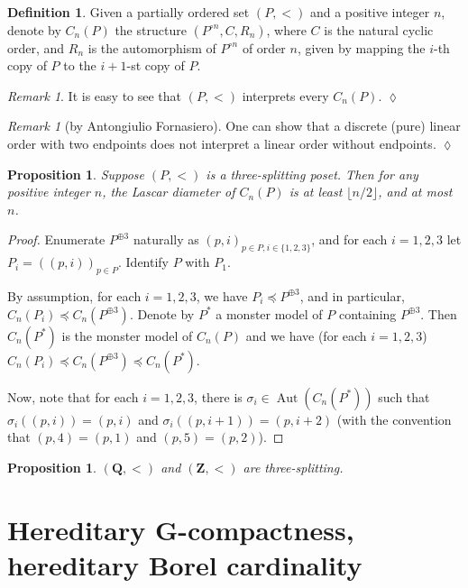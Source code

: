 \documentclass[final,a4paper,12pt]{amsart}
\newcommand{\bZ}{{\mathbf{Z}}}
\newcommand{\bQ}{{\mathbf{Q}}}
\DeclareMathOperator{\Aut}{{Aut}}
\newtheorem{prop}[thm]{Proposition}
\theoremstyle{remark}
\newtheorem{rem}[thm]{Remark}
\theoremstyle{definition}
\newtheorem{dfn}[thm]{Definition}
\newcommand{\xqed}[1]{%
	\leavevmode\unskip\penalty9999 \hbox{}\nobreak\hfill
	\quad\hbox{\ensuremath{#1}}}
\begin{document}
	\begin{dfn}
		Given a partially ordered set $(P,<)$ and a positive integer $n$, denote by $C_n(P)$ the structure $(P^{\circ n},C,R_n)$, where $C$ is the natural cyclic order, and $R_n$ is the automorphism of $P^{\circ n}$ of order $n$, given by mapping the $i$-th copy of $P$ to the $i+1$-st copy of $P$.
	\end{dfn}
	
	\begin{rem}
		It is easy to see that $(P,<)$ interprets every $C_n(P)$.\xqed{\lozenge}
	\end{rem}
	
	\begin{rem}[by Antongiulio Fornasiero]
		One can show that a discrete (pure) linear order with two endpoints does not interpret a linear order without endpoints.\xqed{\lozenge}
	\end{rem}
	
	\begin{prop}
		Suppose $(P,<)$ is a three-splitting poset. Then for any positive integer $n$, the Lascar diameter of $C_n(P)$ is at least $\lfloor n/2\rfloor$, and at most $n$.
	\end{prop}
	\begin{proof}
		Enumerate $P^{\oplus 3}$ naturally as $(p,i)_{p\in P,i\in \{1,2,3\}}$, and for each $i=1,2,3$ let $P_i=((p,i))_{p\in P}$. Identify $P$ with $P_1$.
		
		By assumption, for each $i=1,2,3$, we have $P_i\preceq P^{\oplus 3}$, and in particular, $C_n(P_i)\preceq C_n(P^{\oplus 3})$. Denote by $P^*$ a monster model of $P$ containing $P^{\oplus 3}$. Then $C_n(P^*)$ is the monster model of $C_n(P)$ and we have (for each $i=1,2,3$) $C_n(P_i)\preceq C_n(P^{\oplus 3})\preceq C_n(P^*)$.
		
		Now, note that for each $i=1,2,3$, there is $\sigma_i\in \Aut(C_n(P^*))$ such that $\sigma_i((p,i))=(p,i)$ and $\sigma_i((p,i+1))=(p,i+2)$ (with the convention that $(p,4)=(p,1)$ and $(p,5)=(p,2)$).
	\end{proof}
	
	\begin{prop}
		$(\bQ,<)$ and $(\bZ, <)$ are three-splitting.
	\end{prop}
	
	\section{Hereditary G-compactness, hereditary Borel cardinality}
	
\end{document}
